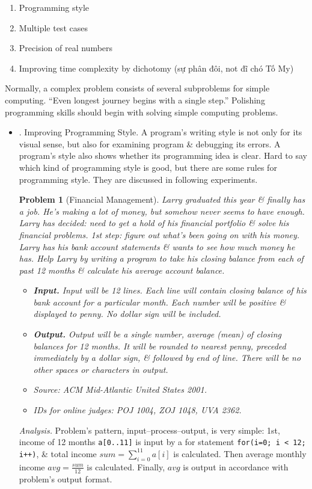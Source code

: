 \documentclass{article}
\newtheorem{problem}{Problem}
\begin{document}
\begin{itemize}
\begin{itemize}
		\begin{enumerate}
			\item Programming style
			\item Multiple test cases
			\item Precision of real numbers
			\item Improving time complexity by dichotomy (sự phân đôi, not đĩ chó Tố My)
		\end{enumerate}
		Normally, a complex problem consists of several subproblems for simple computing. ``Even longest journey begins with a single step.'' Polishing programming skills should begin with solving simple computing problems.
		\begin{itemize}
			\item {. Improving Programming Style.} A program's writing style is not only for its visual sense, but also for examining program \& debugging its errors. A program's style also shows whether its programming idea is clear. Hard to say which kind of programming style is good, but there are some rules for programming style. They are discussed in following experiments.
			\begin{problem}[Financial Management]
				{\sc Larry} graduated this year \& finally has a job. He's making a lot of money, but somehow never seems to have enough. {\sc Larry} has decided: need to get a hold of his financial portfolio \& solve his financial problems. 1st step: figure out what's been going on with his money. {\sc Larry} has his bank account statements \& wants to see how much money he has. Help {\sc Larry} by writing a program to take his closing balance from each of past 12 months \& calculate his average account balance.
				\begin{itemize}
					\item {\bf Input.} Input will be 12 lines. Each line will contain closing balance of his bank account for a particular month. Each number will be positive \& displayed to penny. No dollar sign will be included.
					\item {\bf Output.} Output will be a single number, average (mean) of closing balances for 12 months. It will be rounded to nearest penny, preceded immediately by a dollar sign, \& followed by end of line. There will be no other spaces or characters in output.
					\item Source: ACM Mid-Atlantic United States 2001.
					\item IDs for online judges: POJ 1004, ZOJ 1048, UVA 2362.
				\end{itemize}
			\end{problem}
			{\it Analysis.} Problem's pattern, input--process--output, is very simple: 1st, income of 12 months {\tt a[0..11]} is input by a for statement {\tt for(i=0; i < 12; i++)}, \& total income $sum = \sum_{i=0}^{11} a[i]$ is calculated. Then average monthly income $avg = \frac{sum}{12}$ is calculated. Finally, $avg$ is output in accordance with problem's output format.
			

\end{itemize}
\end{itemize}
\end{itemize}
\end{document}

